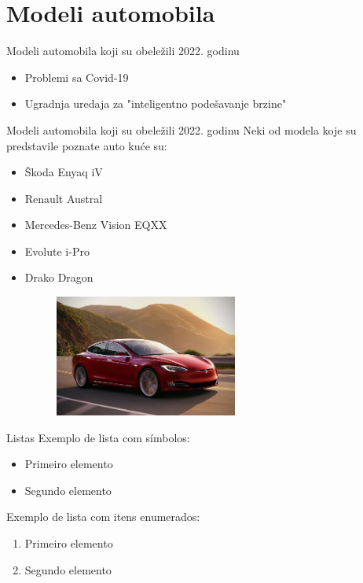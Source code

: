 \documentclass[11pt]{beamer}
\begin{document}
\section{Modeli automobila}

\begin{frame}{Modeli automobila koji su obeležili 2022. godinu}{\thesection \, \secname}

\begin{itemize}
\item Problemi sa Covid-19 
\item Ugradnja uredaja za "inteligentno podešavanje brzine"
\end{itemize}
\end{frame}

\begin{frame}{Modeli automobila koji su obeležili 2022. godinu}
Neki od modela koje su predstavile poznate auto kuće su:
\begin{itemize}
\item Škoda Enyaq iV
\item Renault Austral
\item Mercedes-Benz Vision EQXX
\item Evolute i-Pro
\item Drako Dragon

\begin{figure}[h]
        \centering
        \includegraphics[width=60mm, scale=0.5]{tesla.jpeg}
        \label{fig:tesla.jpeg}
        \end{figure}

\end{itemize}

\end{frame}

\begin{frame}{Listas}
    Exemplo de lista com símbolos:

    \begin{itemize}
        \item Primeiro elemento
        \item Segundo elemento
    \end{itemize}
    
    \bigskip
    
    Exemplo de lista com itens enumerados:
    
    \begin{enumerate}
        \item Primeiro elemento
        \item Segundo elemento
    \end{enumerate}
\end{frame}
\end{document}
